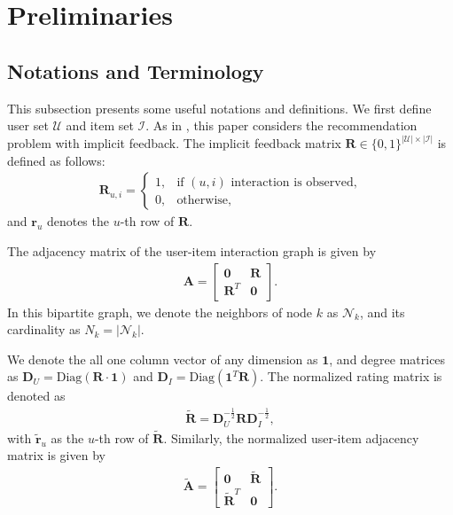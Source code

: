 \documentclass[sigconf]{acmart}
\begin{document}
\section{Preliminaries}
\label{sec:pre}
\subsection{Notations and Terminology}
This subsection presents some useful notations and definitions. We first define user set $\mathcal{U}$ and item set $\mathcal{I}$. As in \cite{he2020lightgcn}, this paper considers the recommendation problem with implicit feedback. The implicit feedback matrix $\bm{R} \in \{0,1\}^{|\mathcal{U}| \times |\mathcal{I}|}$ is defined as  follows:
\begin{align*}
    \bm{R}_{u,i} = \left\{
             \begin{array}{lr}
             1, & \text{if $(u,i)$ interaction is observed,}   \\
             0, & \text{otherwise},
             \end{array}
\right.
\end{align*}
and $\bm{r}_u$ denotes the $u$-th row of $\bm{R}$.

The adjacency matrix of the user-item interaction graph is given by 
\begin{align} \label{graph:bi}
    \bm{A} = \begin{bmatrix}
    \bm{0} & \bm{R} \\
    \bm{R}^T & \bm{0} 
    \end{bmatrix}.
\end{align}
In this bipartite graph, we denote the neighbors of node $k$ as $\mathcal{N}_k$, and its cardinality as $N_k = |\mathcal{N}_k|$.

We denote the all one column vector of any dimension as $\bm{1}$, and degree matrices as $\bm{D}_U = \text{Diag}(\bm{R} \cdot \bm{1})$ and $\bm{D}_I = \text{Diag}(\bm{1}^T \bm{R})$. The normalized rating matrix is denoted as 
\begin{align*}
    \tilde{\bm{R}} = \bm{D}_U^{-\frac{1}{2}} \bm{R} \bm{D}_I^{-\frac{1}{2}},
\end{align*}
with $\tilde{\bm{r}}_u$ as the $u$-th row of $\tilde{\bm{R}}$. Similarly, the normalized user-item adjacency matrix is given by
\begin{align*}
    \tilde{\bm{A}} = \begin{bmatrix}
    \bm{0} & \tilde{\bm{R}} \\
    \tilde{\bm{R}}^T & \bm{0} 
    \end{bmatrix}.
\end{align*}
\end{document}
